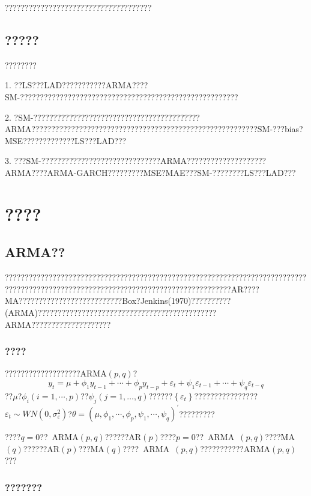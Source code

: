 \documentclass[a4paper,12pt,openany,oneside,utf-8]{ctexbook}
\begin{document}
	?????????????????????????????????????
	
	\section{?????}
	
	????????
	
	1. ??LS???LAD???????????ARMA????SM-???????????????????????????????????????????????????????
	
	2. ?SM-??????????????????????????????????????????ARMA?????????????????????????????????????????????????????????SM-???bias?MSE?????????????LS???LAD???
	
	3. ???SM-??????????????????????????????ARMA????????????????????ARMA????ARMA-GARCH?????????MSE?MAE???SM-????????LS???LAD???
	
	\chapter[????]{????}
	\section{ARMA??}
	
	?????????????????????????????????????????????????????????????????????????????????????????????????????????????????????????????????????AR????MA??????????????????????????Box?Jenkins(1970)??????????(ARMA)?????????????????????????????????????????????ARMA????????????????????
	
	\subsection{????}
	
	???????????????????ARMA$(p,q)$?
	\begin{equation}\label{201}
		y_{t}=\mu+\phi_{1} y_{t-1}+\cdots+\phi_{p} y_{t-p}+\varepsilon_{t}+\psi_{1} \varepsilon_{t-1} +\cdots+\psi_{q} \varepsilon_{t-q}
	\end{equation}
	??$\mu$?$\phi_i \left(i=1,\cdots,p\right)$??$\psi_j\left(j=1,\ldots,q\right)$??????$\left\{\varepsilon_t\right\}$????????????????$\varepsilon_t\sim WN(0,\sigma_{\varepsilon}^{2})$?$\theta=(\mu,\phi_1,\cdots,\phi_p,\psi_1,\cdots,\psi_q)^{\prime}$?????????
	
	????$q=0$??~ARMA$(p,q)$??????AR$(p)$????$p=0$??~ARMA~$(p,q)$????MA$(q)$??????AR$(p)$???MA$(q)$????~ARMA~$(p,q)$???????????ARMA$(p,q)$???
	
	\subsection{???????}
	
\end{document}
